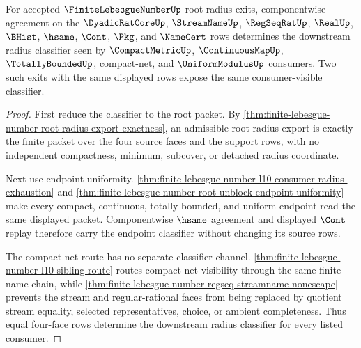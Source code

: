 \begin{theorem}
\label{thm:finite-lebesgue-number-four-face-radius-exit-determinacy}
For accepted $\FiniteLebesgueNumberUp$ root-radius exits, componentwise agreement on the $\DyadicRatCoreUp$, $\StreamNameUp$, $\RegSeqRatUp$, $\RealUp$, $\BHist$, $\hsame$, $\Cont$, $\Pkg$, and $\NameCert$ rows determines the downstream radius classifier seen by $\CompactMetricUp$, $\ContinuousMapUp$, $\TotallyBoundedUp$, compact-net, and $\UniformModulusUp$ consumers. Two such exits with the same displayed rows expose the same consumer-visible classifier.
\end{theorem}
\begin{proof}
First reduce the classifier to the root packet. By \autoref{thm:finite-lebesgue-number-root-radius-export-exactness}, an admissible root-radius export is exactly the finite packet over the four source faces and the support rows, with no independent compactness, minimum, subcover, or detached radius coordinate.

Next use endpoint uniformity. \autoref{thm:finite-lebesgue-number-l10-consumer-radius-exhaustion} and \autoref{thm:finite-lebesgue-number-root-unblock-endpoint-uniformity} make every compact, continuous, totally bounded, and uniform endpoint read the same displayed packet. Componentwise $\hsame$ agreement and displayed $\Cont$ replay therefore carry the endpoint classifier without changing its source rows.

The compact-net route has no separate classifier channel. \autoref{thm:finite-lebesgue-number-l10-sibling-route} routes compact-net visibility through the same finite-name chain, while \autoref{thm:finite-lebesgue-number-regseq-streamname-nonescape} prevents the stream and regular-rational faces from being replaced by quotient stream equality, selected representatives, choice, or ambient completeness. Thus equal four-face rows determine the downstream radius classifier for every listed consumer.
\end{proof}

